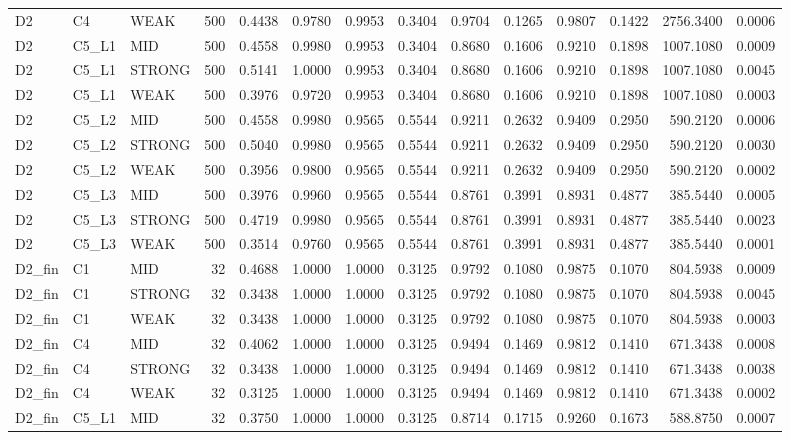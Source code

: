 \begin{tabular}{lllrrrrrrrrrrr}
D2 & C4 & WEAK & 500 & 0.4438 & 0.9780 & 0.9953 & 0.3404 & 0.9704 & 0.1265 & 0.9807 & 0.1422 & 2756.3400 & 0.0006 \\
D2 & C5\_L1 & MID & 500 & 0.4558 & 0.9980 & 0.9953 & 0.3404 & 0.8680 & 0.1606 & 0.9210 & 0.1898 & 1007.1080 & 0.0009 \\
D2 & C5\_L1 & STRONG & 500 & 0.5141 & 1.0000 & 0.9953 & 0.3404 & 0.8680 & 0.1606 & 0.9210 & 0.1898 & 1007.1080 & 0.0045 \\
D2 & C5\_L1 & WEAK & 500 & 0.3976 & 0.9720 & 0.9953 & 0.3404 & 0.8680 & 0.1606 & 0.9210 & 0.1898 & 1007.1080 & 0.0003 \\
D2 & C5\_L2 & MID & 500 & 0.4558 & 0.9980 & 0.9565 & 0.5544 & 0.9211 & 0.2632 & 0.9409 & 0.2950 & 590.2120 & 0.0006 \\
D2 & C5\_L2 & STRONG & 500 & 0.5040 & 0.9980 & 0.9565 & 0.5544 & 0.9211 & 0.2632 & 0.9409 & 0.2950 & 590.2120 & 0.0030 \\
D2 & C5\_L2 & WEAK & 500 & 0.3956 & 0.9800 & 0.9565 & 0.5544 & 0.9211 & 0.2632 & 0.9409 & 0.2950 & 590.2120 & 0.0002 \\
D2 & C5\_L3 & MID & 500 & 0.3976 & 0.9960 & 0.9565 & 0.5544 & 0.8761 & 0.3991 & 0.8931 & 0.4877 & 385.5440 & 0.0005 \\
D2 & C5\_L3 & STRONG & 500 & 0.4719 & 0.9980 & 0.9565 & 0.5544 & 0.8761 & 0.3991 & 0.8931 & 0.4877 & 385.5440 & 0.0023 \\
D2 & C5\_L3 & WEAK & 500 & 0.3514 & 0.9760 & 0.9565 & 0.5544 & 0.8761 & 0.3991 & 0.8931 & 0.4877 & 385.5440 & 0.0001 \\
D2\_fin & C1 & MID & 32 & 0.4688 & 1.0000 & 1.0000 & 0.3125 & 0.9792 & 0.1080 & 0.9875 & 0.1070 & 804.5938 & 0.0009 \\
D2\_fin & C1 & STRONG & 32 & 0.3438 & 1.0000 & 1.0000 & 0.3125 & 0.9792 & 0.1080 & 0.9875 & 0.1070 & 804.5938 & 0.0045 \\
D2\_fin & C1 & WEAK & 32 & 0.3438 & 1.0000 & 1.0000 & 0.3125 & 0.9792 & 0.1080 & 0.9875 & 0.1070 & 804.5938 & 0.0003 \\
D2\_fin & C4 & MID & 32 & 0.4062 & 1.0000 & 1.0000 & 0.3125 & 0.9494 & 0.1469 & 0.9812 & 0.1410 & 671.3438 & 0.0008 \\
D2\_fin & C4 & STRONG & 32 & 0.3438 & 1.0000 & 1.0000 & 0.3125 & 0.9494 & 0.1469 & 0.9812 & 0.1410 & 671.3438 & 0.0038 \\
D2\_fin & C4 & WEAK & 32 & 0.3125 & 1.0000 & 1.0000 & 0.3125 & 0.9494 & 0.1469 & 0.9812 & 0.1410 & 671.3438 & 0.0002 \\
D2\_fin & C5\_L1 & MID & 32 & 0.3750 & 1.0000 & 1.0000 & 0.3125 & 0.8714 & 0.1715 & 0.9260 & 0.1673 & 588.8750 & 0.0007 \\

\end{tabular}
